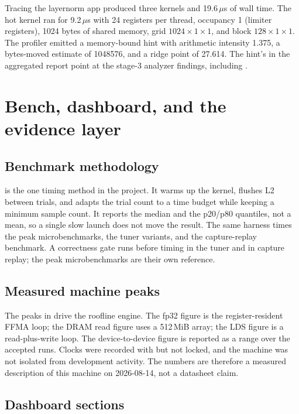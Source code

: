 Tracing the layernorm app produced three kernels and 19.6\,$\mu$s of wall
time. The hot kernel ran for 9.2\,$\mu$s with 24 registers per thread,
occupancy 1 (limiter registers), 1024 bytes of shared memory, grid
$1024 \times 1 \times 1$, and block $128 \times 1 \times 1$. The profiler
emitted a memory-bound hint with arithmetic intensity 1.375, a bytes-moved
estimate of 1048576, and a ridge point of 27.614. The hint's
 in the aggregated report point at the stage-3
analyzer findings, including .

\section{Bench, dashboard, and the evidence layer}
\label{sec:dashboard}

\subsection{Benchmark methodology}
\label{sec:bench-method}

 is the one timing method in the project. It warms up the
kernel, flushes L2 between trials, and adapts the trial count to a time budget
while keeping a minimum sample count. It reports the median and the p20/p80
quantiles, not a mean, so a single slow launch does not move the result. The
same harness times the peak microbenchmarks, the tuner variants, and the
capture-replay benchmark. A correctness gate runs before timing in the
tuner and in capture replay; the peak microbenchmarks are their own reference.

\subsection{Measured machine peaks}
\label{sec:peaks}

The peaks in  drive the roofline engine. The fp32 figure is
the register-resident FFMA loop; the DRAM read figure uses a 512\,MiB array;
the LDS figure is a read-plus-write loop. The device-to-device figure is
reported as a range over the accepted runs. Clocks were recorded with
 but not locked, and the machine was not isolated from
development activity. The numbers are therefore a measured description of
this machine on 2026-08-14, not a datasheet claim.

\subsection{Dashboard sections}
\label{sec:dashboard-sections}

